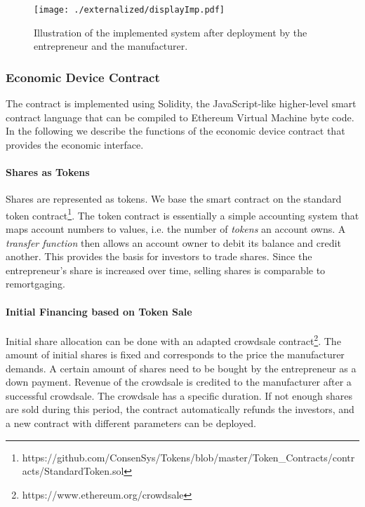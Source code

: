 \begin{figure}
 \centering
 \texttt{[image: ./externalized/displayImp.pdf]}
 \caption{Illustration of the implemented system after deployment by the entrepreneur and the manufacturer.}
 \label{fig:displayImp}
 \end{figure}


\subsubsection{Economic Device Contract}

The contract is implemented using Solidity, the JavaScript-like higher-level smart contract language that can be compiled to Ethereum Virtual Machine byte code. In the following we describe the functions of the economic device contract that provides the economic interface.

\paragraph{Shares as Tokens}

Shares are represented as tokens. We base the smart contract on the standard token contract\footnote{https://github.com/ConsenSys/Tokens/blob/master/Token\_Contracts/contracts/StandardToken.sol}. The token contract is essentially a simple accounting system that maps account numbers to values, i.e. the number of \emph{tokens} an account owns. A \emph{transfer function} then allows an account owner to debit its balance and credit another. This provides the basis for investors to trade shares. Since the entrepreneur's share is increased over time, selling shares is comparable to remortgaging.

\paragraph{Initial Financing based on Token Sale}

Initial share allocation can be done with an adapted crowdsale contract\footnote{https://www.ethereum.org/crowdsale}. The amount of initial shares is fixed and corresponds to the price the manufacturer demands. A certain amount of shares need to be bought by the entrepreneur as a down payment. Revenue of the crowdsale is credited to the manufacturer after a successful crowdsale. The crowdsale has a specific duration. If not enough shares are sold during this period, the contract automatically refunds the investors, and a new contract with different parameters can be deployed.

